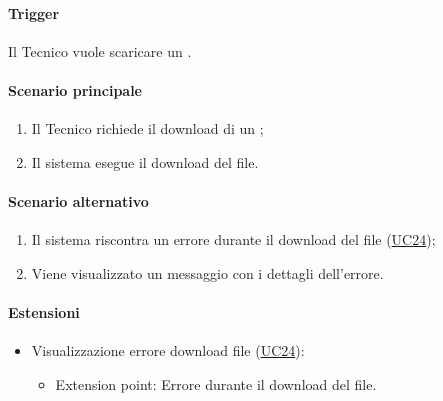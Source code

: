 \paragraph*{Trigger}
Il Tecnico vuole scaricare un .

\paragraph*{Scenario principale}
\begin{enumerate}
  \item Il Tecnico richiede il download di un ;
  \item Il sistema esegue il download del file.
\end{enumerate}

\paragraph*{Scenario alternativo}
\begin{enumerate}
  \item Il sistema riscontra un errore durante il download del file (\hyperref[UC24]{UC24});
  \item Viene visualizzato un messaggio con i dettagli dell'errore.
\end{enumerate}

\paragraph*{Estensioni}
\begin{itemize}
  \item Visualizzazione errore download file (\hyperref[UC24]{UC24}):
  \begin{itemize}
    \item Extension point: Errore durante il download del file.
  \end{itemize}
\end{itemize}